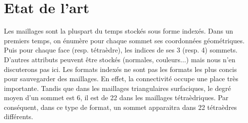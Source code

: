 \section{Etat de l'art}
\noindent
Les maillages sont la pluspart du temps stockés sous forme indexés. Dans un premiers temps, on énumère pour chaque sommet ses coordonnées géométriques. Puis pour chaque face (resp. tétraèdre), les indices de ses 3 (resp. 4) sommets. D'autres attributs peuvent être stockés (normales, couleurs...) mais nous n'en discuterons pas ici. Les formats indexés ne sont pas les formats les plus concis pour sauvegarder des maillages. En effet, la connectivité occupe une place très importante. Tandis que dans les maillages triangulaires surfaciques, le degré moyen d'un sommet est 6, il est de 22 dans les maillages tétraèdriques. Par conséquent, dans ce type de format, un sommet apparaitra dans 22 tétraèdres différents.\\
